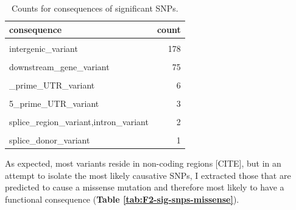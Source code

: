 \documentclass[
]{book}
\begin{document}
\begin{table}

\caption{\label{tab:F2-sig-snps-consq-counts}Counts for consequences of significant SNPs.}
\centering
\begin{tabular}[t]{lr}
\toprule
consequence & count\\
\midrule
\cellcolor{gray!6}{intron\_variant} & \cellcolor{gray!6}{349}\\
intergenic\_variant & 178\\
\cellcolor{gray!6}{upstream\_gene\_variant} & \cellcolor{gray!6}{92}\\
downstream\_gene\_variant & 75\\
\cellcolor{gray!6}{synonymous\_variant} & \cellcolor{gray!6}{9}\\
\addlinespace
3\_prime\_UTR\_variant & 6\\
\cellcolor{gray!6}{missense\_variant} & \cellcolor{gray!6}{6}\\
5\_prime\_UTR\_variant & 3\\
\cellcolor{gray!6}{splice\_acceptor\_variant} & \cellcolor{gray!6}{2}\\
splice\_region\_variant,intron\_variant & 2\\
\addlinespace
\cellcolor{gray!6}{splice\_region\_variant,synonymous\_variant} & \cellcolor{gray!6}{2}\\
splice\_donor\_variant & 1\\
\bottomrule
\end{tabular}
\end{table}

As expected, most variants reside in non-coding regions {[}CITE{]}, but in an attempt to isolate the most likely causative SNPs, I extracted those that are predicted to cause a missense mutation and therefore most likely to have a functional consequence (\textbf{Table \ref{tab:F2-sig-snps-missense}}).
\end{document}
